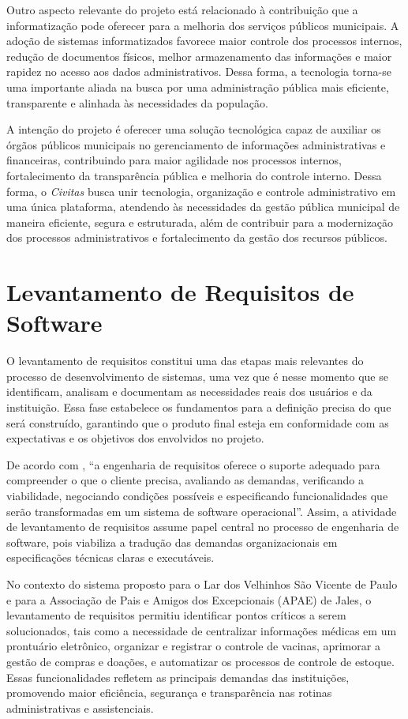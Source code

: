 Outro aspecto relevante do projeto está relacionado à contribuição que a informatização pode oferecer para a melhoria dos serviços públicos municipais. A adoção de sistemas informatizados favorece maior controle dos processos internos, redução de documentos físicos, melhor armazenamento das informações e maior rapidez no acesso aos dados administrativos. Dessa forma, a tecnologia torna-se uma importante aliada na busca por uma administração pública mais eficiente, transparente e alinhada às necessidades da população.

A intenção do projeto é oferecer uma solução tecnológica capaz de auxiliar os órgãos públicos municipais no gerenciamento de informações administrativas e financeiras, contribuindo para maior agilidade nos processos internos, fortalecimento da transparência pública e melhoria do controle interno. Dessa forma, o \textit{Civitas} busca unir tecnologia, organização e controle administrativo em uma única plataforma, atendendo às necessidades da gestão pública municipal de maneira eficiente, segura e estruturada, além de contribuir para a modernização dos processos administrativos e fortalecimento da gestão dos recursos públicos.


\chapter{Levantamento de Requisitos de Software}

O levantamento de requisitos constitui uma das etapas mais relevantes do processo de desenvolvimento de sistemas, uma vez que é nesse momento que se identificam, analisam e documentam as necessidades reais dos usuários e da instituição. Essa fase estabelece os fundamentos para a definição precisa do que será construído, garantindo que o produto final esteja em conformidade com as expectativas e os objetivos dos envolvidos no projeto.  

De acordo com \textcite[p.~118]{Pressman2011ES7}, “a engenharia de requisitos oferece o suporte adequado para compreender o que o cliente precisa, avaliando as demandas, verificando a viabilidade, negociando condições possíveis e especificando funcionalidades que serão transformadas em um sistema de software operacional”. Assim, a atividade de levantamento de requisitos assume papel central no processo de engenharia de software, pois viabiliza a tradução das demandas organizacionais em especificações técnicas claras e executáveis.  

No contexto do sistema proposto para o Lar dos Velhinhos São Vicente de Paulo e para a Associação de Pais e Amigos dos Excepcionais (APAE) de Jales, o levantamento de requisitos permitiu identificar pontos críticos a serem solucionados, tais como a necessidade de centralizar informações médicas em um prontuário eletrônico, organizar e registrar o controle de vacinas, aprimorar a gestão de compras e doações, e automatizar os processos de controle de estoque. Essas funcionalidades refletem as principais demandas das instituições, promovendo maior eficiência, segurança e transparência nas rotinas administrativas e assistenciais.  


